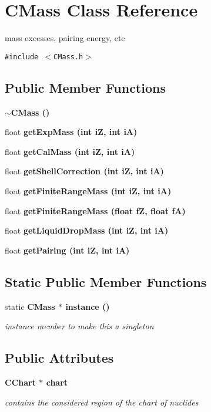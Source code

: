 \section{CMass Class Reference}
\label{classCMass}
mass excesses, pairing energy, etc  


{\tt \#include $<$CMass.h$>$}

\subsection*{Public Member Functions}
\begin{CompactItemize}
\item 
\bf{$\sim$CMass} ()
\item 
float \bf{get\-Exp\-Mass} (int i\-Z, int i\-A)
\item 
float \bf{get\-Cal\-Mass} (int i\-Z, int i\-A)
\item 
float \bf{get\-Shell\-Correction} (int i\-Z, int i\-A)
\item 
float \bf{get\-Finite\-Range\-Mass} (int i\-Z, int i\-A)
\item 
float \bf{get\-Finite\-Range\-Mass} (float f\-Z, float f\-A)
\item 
float \bf{get\-Liquid\-Drop\-Mass} (int i\-Z, int i\-A)
\item 
float \bf{get\-Pairing} (int i\-Z, int i\-A)
\end{CompactItemize}
\subsection*{Static Public Member Functions}
\begin{CompactItemize}
\item 
static \bf{CMass} $\ast$ \bf{instance} ()\label{classCMass_51bdc5af6783bf9c96a9aeab104caa94}

\begin{CompactList}\small\item\em instance member to make this a singleton \item\end{CompactList}\end{CompactItemize}
\subsection*{Public Attributes}
\begin{CompactItemize}
\item 
\bf{CChart} $\ast$ \bf{chart}\label{classCMass_123e5bd2e0b1741449817e01c45c377b}

\begin{CompactList}\small\item\em contains the considered region of the chart of nuclides \item\end{CompactList}\end{CompactItemize}
